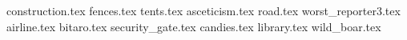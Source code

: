 \documentclass[11pt,a4paper,oneside,arabic,korean]{article}
\begin{document}
	


	{construction.tex}
	{fences.tex}
	{tents.tex}
	{asceticism.tex}
	{road.tex}
	{worst_reporter3.tex}
	{airline.tex}
	{bitaro.tex}
	{security_gate.tex}
	{candies.tex}
	{library.tex}
	{wild_boar.tex}
\end{document}

